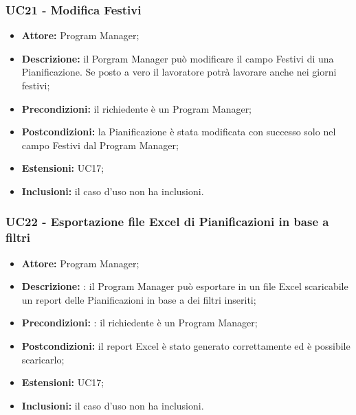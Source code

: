 \subsubsection*{UC21 - Modifica Festivi}
\begin{itemize}[label=$\circ$]
\item \textbf{Attore:} Program Manager;
\item \textbf{Descrizione:} il Porgram Manager può modificare il campo Festivi di una Pianificazione. Se posto a vero il lavoratore potrà lavorare anche nei giorni festivi;
\item \textbf{Precondizioni:} il richiedente è un Program Manager;
\item \textbf{Postcondizioni:}  la Pianificazione è stata modificata con successo solo nel campo Festivi dal Program Manager;
\item \textbf{Estensioni:} UC17;
\item \textbf{Inclusioni:} il caso d'uso non ha inclusioni.
\end{itemize}

\subsubsection*{UC22 - Esportazione file Excel di Pianificazioni in base a filtri}
\begin{itemize}[label=$\circ$]
\item \textbf{Attore:} Program Manager;
\item \textbf{Descrizione:} : il Program Manager può esportare in un
file Excel scaricabile un report delle Pianificazioni in base a dei filtri inseriti;
\item \textbf{Precondizioni:} : il richiedente è un Program Manager;
\item \textbf{Postcondizioni:} il report Excel è stato generato correttamente ed è possibile
scaricarlo;
\item \textbf{Estensioni:} UC17;
\item \textbf{Inclusioni:} il caso d'uso non ha inclusioni.
\end{itemize}

